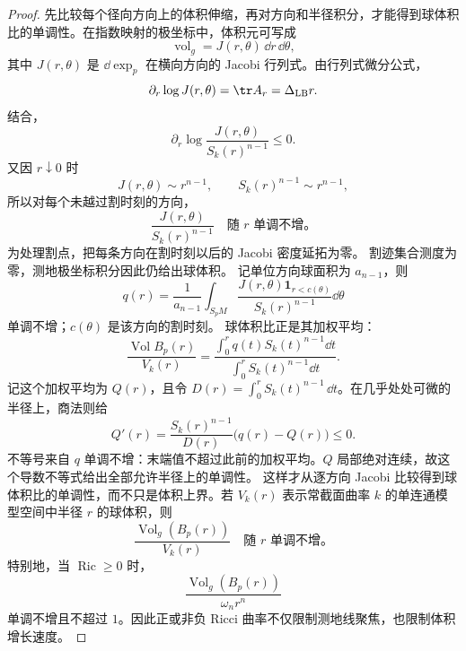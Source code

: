 \begin{proof}
先比较每个径向方向上的体积伸缩，再对方向和半径积分，才能得到球体积比的单调性。在指数映射的极坐标中，体积元可写成
\[
\operatorname{vol}_g=J(r,\theta)\,\dd r\,\dd\theta,
\]
其中 $J(r,\theta)$ 是 $\dd\exp_p$ 在横向方向的 Jacobi 行列式。由行列式微分公式，
\[
\partial_r\log J(r,\theta)
=\tr A_r
=\Delta_{\mathrm{LB}} r.
\]
结合，
\[
\partial_r
\log\frac{J(r,\theta)}{S_k(r)^{n-1}}
\le0.
\]
又因 $r\downarrow0$ 时
\[
J(r,\theta)\sim r^{n-1},
\qquad
S_k(r)^{n-1}\sim r^{n-1},
\]
所以对每个未越过割时刻的方向，
\begin{equation}
\frac{J(r,\theta)}{S_k(r)^{n-1}}
\quad\text{随 $r$ 单调不增。}
\label{eq:math-dg-jacobian-comparison}
\end{equation}
为处理割点，把每条方向在割时刻以后的 Jacobi 密度延拓为零。
割迹集合测度为零，测地极坐标积分因此仍给出球体积。
记单位方向球面积为 $a_{n-1}$，则
\[
q(r)=\frac1{a_{n-1}}\int_{S_pM}
\frac{J(r,\theta)\mathbf1_{r<c(\theta)}}{S_k(r)^{n-1}}\dd\theta
\]
单调不增；$c(\theta)$ 是该方向的割时刻。
球体积比正是其加权平均：
\[
\frac{\operatorname{Vol}B_p(r)}{V_k(r)}
=\frac{\int_0^r q(t)S_k(t)^{n-1}\dd t}
{\int_0^r S_k(t)^{n-1}\dd t}.
\]
记这个加权平均为 $Q(r)$，且令 $D(r)=\int_0^rS_k(t)^{n-1}\,\dd t$。在几乎处处可微的半径上，商法则给
\[
Q'(r)=\frac{S_k(r)^{n-1}}{D(r)}\bigl(q(r)-Q(r)\bigr)\le0.
\]
不等号来自 $q$ 单调不增：末端值不超过此前的加权平均。$Q$ 局部绝对连续，故这个导数不等式给出全部允许半径上的单调性。
这样才从逐方向 Jacobi 比较得到球体积比的单调性，而不只是体积上界。若 $V_k(r)$ 表示常截面曲率 $k$ 的单连通模型空间中半径 $r$ 的球体积，则
\begin{equation}
{
\frac{\operatorname{Vol}_g(B_p(r))}{V_k(r)}
\quad\text{随 $r$ 单调不增。}
}
\label{eq:math-dg-bishop-gromov}
\end{equation}
特别地，当 $\operatorname{Ric}\ge0$ 时，
\[
\frac{\operatorname{Vol}_g(B_p(r))}{\omega_n r^n}
\]
单调不增且不超过 $1$。因此正或非负 Ricci 曲率不仅限制测地线聚焦，也限制体积增长速度。
\end{proof}

